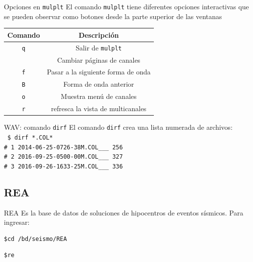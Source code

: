\documentclass[11pt]{beamer}
\begin{document}
\begin{frame}{Opciones en {\tt mulplt}}
El comando {\tt mulplt} tiene diferentes opciones interactivas que se pueden observar como botones desde la parte superior de las ventanas
\begin{table} 
\begin{tabular}{|c|c|}
\hline 
{\bf Comando} & {\bf Descripción} \\ 
\hline 
{\tt q} & Salir de {\tt mulplt} \\ 
\hline 
\keys{\tab} & Cambiar páginas de canales \\ 
\hline 
{\tt f} & Pasar a la siguiente forma de onda  \\ 
\hline 
{\tt B} & Forma de onda anterior \\ 
\hline 
{\tt o} & Muestra menú de canales\\ 
\hline 
{\tt r} & refresca la vista de multicanales \\ 
\hline 
\end{tabular}
\end{table}
\end{frame}

\begin{frame}{WAV: comando {\tt dirf}}
El comando {\tt dirf} crea una lista numerada de archivos:\\
{\small \tt 
 \$ dirf *.COL*\\
 \#  1  2014-06-25-0726-38M.COL\_\_\_ 256 \\                                        
 \#  2  2016-09-25-0500-00M.COL\_\_\_ 327 \\                                        
 \#  3  2016-09-26-1633-25M.COL\_\_\_ 336 \\
}
\end{frame}



\subsection{REA}
\begin{frame}[fragile]{REA}
Es la base de datos de soluciones de hipocentros de eventos sísmicos. Para ingresar:\\
\begin{verbatim}
$cd /bd/seismo/REA
\end{verbatim}
\begin{verbatim}
$re
\end{verbatim}
\end{frame}
\end{document}
